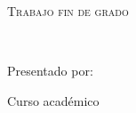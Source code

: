 
\begin{titlepage}
  \AddToShipoutPicture*{\BackgroundPic}

  \begin{addmargin}[2.575cm]{0cm}
  \begin{flushleft}
    \Large  
    \hfill\vfil

    \textsf{\miFacultad}
    \vfill\vfill

    {\huge\textsf\miGrado} \vfill


    \textsc{Trabajo fin de grado}

    \begingroup
    \Huge{\miTitulo} \\ \bigskip
    \endgroup

    \vfill\vfill\vfill\vfill

    \textsf{\normalsize{Presentado por:}}\\
    {\Large\textrm{\miNombre}}

    \vfill
    \textsf{Curso académico \miCurso}
  \end{flushleft}  
  \end{addmargin}       

\end{titlepage}   
\cleardoublepage
\endinput
